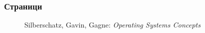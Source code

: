 \documentclass[ignorenonframetext, hyperref=unicode]{beamer}
\begin{document}
\begin{frame}
\frametitle{Страници}
\begin{figure}[h]
\center
{}
\caption{Silberschatz, Gavin, Gagne: {\em Operating Systems Concepts}}
\end{figure}
\end{frame}
\end{document}
